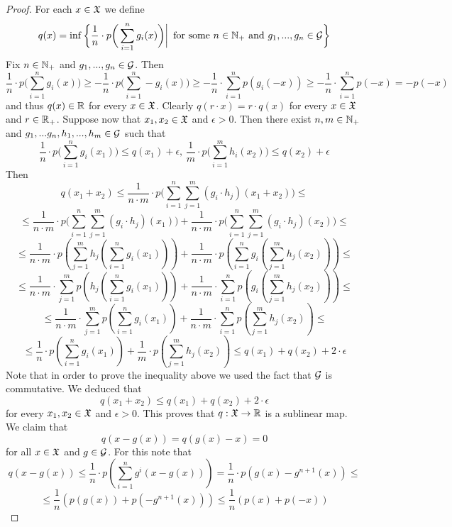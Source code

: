 \begin{proof}
For each $x \in {\mathfrak X}$ we define
$$q(x) = \inf \bigg\{\frac{1}{n}\cdot p\bigg(\sum_{i=1}^ng_i(x)\bigg)\bigg|\,\mbox{ for some }n\in {\mathbb N}_+\mbox{ and }g_1,...,g_n\in {\mathcal G}\bigg\}$$
Fix $n\in {\mathbb N}_+$ and $g_1,...,g_n\in {\mathcal G}$. Then
$$\frac{1}{n}\cdot p\bigg(\sum_{i=1}^ng_i(x)\bigg)\geq -\frac{1}{n}\cdot p\bigg(\sum_{i=1}^n-g_i(x)\bigg) \geq -\frac{1}{n}\cdot \sum_{i=1}^np\left(g_i(-x)\right) \geq -\frac{1}{n}\cdot \sum_{i=1}^np\left(-x\right) = -p(-x)$$
and thus $q(x) \in {\mathbb R}$ for every $x\in {\mathfrak X}$. Clearly $q(r\cdot x) = r\cdot q(x)$ for every $x\in {\mathfrak X}$ and $r\in {\mathbb R}_+$. Suppose now that $x_1,x_2\in {\mathfrak X}$ and $\epsilon > 0$. Then there exist $n,m \in {\mathbb N}_+$ and $g_1,...g_n,h_1,...,h_m \in {\mathcal G}$ such that 
$$\frac{1}{n}\cdot p\bigg(\sum_{i=1}^ng_i(x_1)\bigg) \leq q(x_1) + \epsilon,\,\frac{1}{m}\cdot p\bigg(\sum_{i=1}^m h_i(x_2)\bigg) \leq q(x_2) + \epsilon$$
Then
$$q(x_1 + x_2) \leq \frac{1}{n\cdot m}\cdot p\bigg(\sum_{i=1}^n\sum_{j=1}^m\left(g_i\cdot h_j\right)(x_1 + x_2)\bigg) \leq$$
$$\leq \frac{1}{n\cdot m}\cdot p\bigg(\sum_{i=1}^n\sum_{j=1}^m \left(g_i\cdot h_j\right)(x_1)\bigg) + \frac{1}{n\cdot m}\cdot p\bigg(\sum_{i=1}^n\sum_{j=1}^m\left(g_i\cdot h_j\right)(x_2)\bigg) \leq$$
$$\leq \frac{1}{n\cdot m}\cdot p\left(\sum_{j=1}^m h_j\left(\sum_{i=1}^n g_i\left(x_1\right)\right)\right) + \frac{1}{n\cdot m}\cdot p\left(\sum_{i=1}^n g_i\left(\sum_{j=1}^m h_j\left(x_2\right)\right)\right) \leq $$
$$\leq \frac{1}{n\cdot m}\cdot \sum_{j=1}^m p\left(h_j\left(\sum_{i=1}^n g_i\left(x_1\right)\right)\right) + \frac{1}{n\cdot m}\cdot \sum_{i=1}^n p\left(g_i\left(\sum_{j=1}^m h_j\left(x_2\right)\right)\right) \leq $$
$$\leq \frac{1}{n\cdot m}\cdot \sum_{j=1}^m p\left(\sum_{i=1}^n g_i\left(x_1\right)\right) + \frac{1}{n\cdot m}\cdot \sum_{i=1}^n p\left(\sum_{j=1}^m h_j\left(x_2\right)\right) \leq $$
$$\leq  \frac{1}{n}\cdot p\left(\sum_{i=1}^n g_i\left(x_1\right)\right) + \frac{1}{m}\cdot p\left(\sum_{j=1}^m h_j\left(x_2\right)\right) \leq q(x_1) + q(x_2) + 2\cdot \epsilon$$
Note that in order to prove the inequality above we used the fact that ${\mathcal G}$ is commutative. We deduced that
$$q(x_1 + x_2) \leq q(x_1) + q(x_2) + 2\cdot \epsilon$$
for every $x_1,x_2\in {\mathfrak X}$ and $\epsilon > 0$. This proves that $q:{\mathfrak X} \rightarrow {\mathbb R}$ is a sublinear map. We claim that 
$$q\left(x - g(x)\right) = q\left(g(x) - x\right) = 0$$
for all $x\in {\mathfrak X}$ and $g\in {\mathcal G}$. For this note that
$$q\left(x - g(x)\right) \leq \frac{1}{n}\cdot p\left(\sum_{i=1}^ng^i\left(x - g(x)\right)\right) = \frac{1}{n}\cdot p\left(g(x) - g^{n+1}(x)\right) \leq$$
$$\leq \frac{1}{n}\left(p\left(g(x)\right) + p\left(-g^{n+1}(x)\right)\right) \leq \frac{1}{n}\left(p(x) + p(-x)\right)$$

\end{proof}
